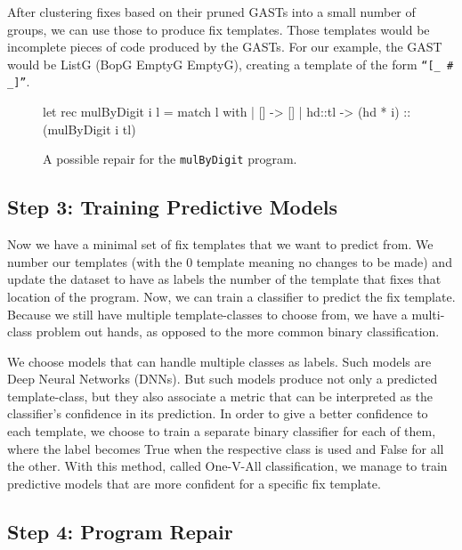  After clustering fixes based on their pruned GASTs into a small number of groups, we can use those to produce fix templates. Those templates would be incomplete pieces of code produced by the GASTs. For our example, the GAST would be ListG (BopG EmptyG EmptyG), creating a template of the form \texttt{“[\_ \# \_]”}.

\begin{figure}[H]
  \begin{ecode}
    let rec mulByDigit i l =
      match l with
      | []     -> []
      | hd::tl -> (hd * i) :: (mulByDigit i tl)
  \end{ecode}
  \caption{A possible repair for the \texttt{mulByDigit} program.}
  \label{fig:suggestion}
\end{figure}



\subsection{Step 3: Training Predictive Models}

Now we have a minimal set of fix templates that we want to predict from. We number our templates (with the 0 template meaning no changes to be made) and update the dataset to have as labels the number of the template that fixes that location of the program. Now, we can train a classifier to predict the fix template. Because we still have multiple template-classes to choose from, we have a multi-class problem out hands, as opposed to the more common binary classification.

 We choose models that can handle multiple classes as labels. Such models are Deep Neural Networks (DNNs). But such models produce not only a predicted template-class, but they also associate a metric that can be interpreted as the classifier’s confidence in its prediction. In order to give a better confidence to each template, we choose to train a separate binary classifier for each of them, where the label becomes True when the respective class is used and False for all the other. With this method, called One-V-All classification, we manage to train predictive models that are more confident for a specific fix template.



\subsection{Step 4: Program Repair}

